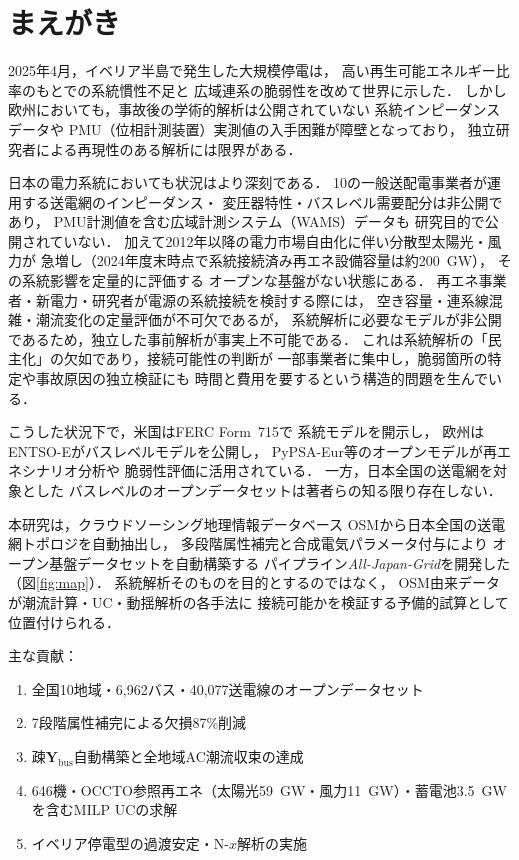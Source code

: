 \documentclass[fleqn]{ieej}
\begin{document}
\section{まえがき}

2025年4月，イベリア半島で発生した大規模停電は，
高い再生可能エネルギー比率のもとでの系統慣性不足と
広域連系の脆弱性を改めて世界に示した\cite{entsoe_iberia2025}．
しかし欧州においても，事故後の学術的解析は公開されていない
系統インピーダンスデータや
PMU（位相計測装置）実測値の入手困難が障壁となっており，
独立研究者による再現性のある解析には限界がある．

日本の電力系統においても状況はより深刻である．
10の一般送配電事業者が運用する送電網のインピーダンス・
変圧器特性・バスレベル需要配分は非公開であり\cite{occto2023}，
PMU計測値を含む広域計測システム（WAMS）データも
研究目的で公開されていない．
加えて2012年以降の電力市場自由化に伴い分散型太陽光・風力が
急増し（2024年度末時点で系統接続済み再エネ設備容量は約200~GW），
その系統影響\cite{yokoyama2022,komiyama2012,manabe2013}を定量的に評価する
オープンな基盤がない状態にある．
再エネ事業者・新電力・研究者が電源の系統接続を検討する際には，
空き容量・連系線混雑・潮流変化の定量評価が不可欠であるが，
系統解析に必要なモデルが非公開であるため，独立した事前解析が事実上不可能である．
これは系統解析の「民主化」の欠如であり，接続可能性の判断が
一部事業者に集中し，脆弱箇所の特定や事故原因の独立検証にも
時間と費用を要するという構造的問題を生んでいる．

こうした状況下で，米国はFERC Form~715で
系統モデルを開示し\cite{birchfield2017}，
欧州はENTSO-Eがバスレベルモデルを公開し\cite{entsoe}，
PyPSA-Eur等のオープンモデルが再エネシナリオ分析や
脆弱性評価に活用されている\cite{pypsa_eur}．
一方，日本全国の送電網を対象とした
バスレベルのオープンデータセットは著者らの知る限り存在しない．

本研究は，クラウドソーシング地理情報データベース
OSM\cite{osm}から日本全国の送電網トポロジを自動抽出し，
多段階属性補完と合成電気パラメータ付与により
オープン基盤データセットを自動構築する
パイプライン\textit{All-Japan-Grid}を開発した
（図\ref{fig:map}）．
系統解析そのものを目的とするのではなく，
OSM由来データが潮流計算・UC・動揺解析の各手法に
接続可能かを検証する予備的試算として位置付けられる．

主な貢献：
\begin{enumerate}
  \item 全国10地域・6,962バス・40,077送電線のオープンデータセット
  \item 7段階属性補完による欠損87\%削減
  \item 疎$\mathbf{Y}_{\mathrm{bus}}$自動構築と全地域AC潮流収束の達成
  \item 646機・OCCTO参照再エネ（太陽光59~GW・風力11~GW）・蓄電池3.5~GWを含むMILP UCの求解
  \item イベリア停電型の過渡安定・N-$x$解析の実施
\end{enumerate}
\end{document}
